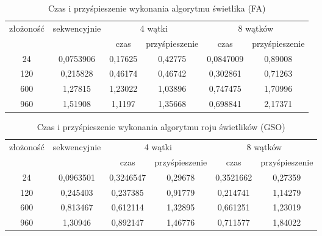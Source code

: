 \documentclass[11pt,a4paper,twoside]{article}
\begin{document}
\bgroup
\def\arraystretch{1.1}
\begin{table}[ht]
\caption{Czas i przyśpieszenie wykonania algorytmu świetlika (FA)}
\label{wspólnaFA}
\centering
\begin{tabular}{|c||c||c|c||c|c|}
\hline
 \multirow{2}{*}{złożoność} & \multirow{2}{*}{sekwencyjnie} & \multicolumn{2}{c||}{4 wątki} & \multicolumn{2}{c|}{8 wątków} \\\cline{3-6}
 & & czas & przyśpieszenie & czas & przyśpieszenie \\\hline
 24  & 0,0753906 & 0,17625 & 0,42775 &  0,0847009 & 0,89008\\\hline
 120  & 0,215828 & 0,46174 & 0,46742 & 0,302861 & 0,71263 \\\hline
 600  & 1,27815 & 1,23022 & 1,03896 & 0,747475 & 1,70996 \\\hline
 960  & 1,51908 & 1,1197 & 1,35668 & 0,698841 & 2,17371 \\\hline
\end{tabular}
\end{table}
\egroup

\bgroup
\def\arraystretch{1.1}
\begin{table}[ht]
\caption{Czas i przyśpieszenie wykonania algorytmu roju świetlików (GSO)}
\label{wspólnaGSO}
\centering
\begin{tabular}{|c||c||c|c||c|c|}
\hline
 \multirow{2}{*}{złożoność} & \multirow{2}{*}{sekwencyjnie} & \multicolumn{2}{c||}{4 wątki} & \multicolumn{2}{c|}{8 wątków} \\\cline{3-6}
 & & czas & przyśpieszenie & czas & przyśpieszenie \\\hline
 24  & 0,0963501 & 0,3246547 & 0,29678 &  0,3521662 & 0,27359\\\hline
 120  & 0,245403 & 0,237385 & 0,91779 & 0,214741 & 1,14279 \\\hline
 600  & 0,813467 & 0,612114 & 1,32895 & 0,661251 & 1,23019 \\\hline
 960  & 1,30946 & 0,892147 & 1,46776 & 0,711577 & 1,84022 \\\hline
\end{tabular}
\end{table}
\egroup
\vspace*{1\baselineskip}
\end{document}
